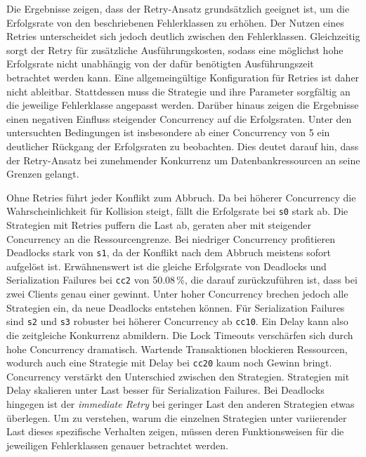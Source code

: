 
Die Ergebnisse zeigen, dass der Retry-Ansatz grundsätzlich geeignet ist, um die Erfolgsrate von den beschriebenen
Fehlerklassen zu erhöhen.
Der Nutzen eines Retries unterscheidet sich jedoch deutlich zwischen den Fehlerklassen.
Gleichzeitig sorgt der Retry für zusätzliche Ausführungskosten, sodass eine möglichst hohe Erfolgsrate nicht
unabhängig von der dafür benötigten Ausführungszeit betrachtet werden kann.
Eine allgemeingültige Konfiguration für Retries ist daher nicht ableitbar.
Stattdessen muss die Strategie und ihre Parameter sorgfältig an die jeweilige Fehlerklasse angepasst werden.
Darüber hinaus zeigen die Ergebnisse einen negativen Einfluss steigender Concurrency auf die Erfolgsraten.
Unter den untersuchten Bedingungen ist insbesondere ab einer Concurrency von 5 ein deutlicher Rückgang der
Erfolgsraten zu beobachten.
Dies deutet darauf hin, dass der Retry-Ansatz bei zunehmender Konkurrenz um Datenbankressourcen an seine Grenzen
gelangt.

Ohne Retries führt jeder Konflikt zum Abbruch.
Da bei höherer Concurrency die Wahrscheinlichkeit für Kollision steigt, fällt die Erfolgsrate bei \texttt{s0} stark ab.
Die Strategien mit Retries puffern die Last ab, geraten aber mit steigender Concurrency an die Ressourcengrenze.
Bei niedriger Concurrency profitieren Deadlocks stark von \texttt{s1}, da der Konflikt nach dem Abbruch meistens
sofort aufgelöst ist.
Erwähnenswert ist die gleiche Erfolgsrate von Deadlocks und Serialization Failures bei \texttt{cc2} von 50.08\,\%,
die darauf zurückzuführen ist, dass bei zwei Clients genau einer gewinnt.
Unter hoher Concurrency brechen jedoch alle Strategien ein, da neue Deadlocks entstehen können.
Für Serialization Failures sind \texttt{s2} und \texttt{s3} robuster bei höherer Concurrency ab \texttt{cc10}.
Ein Delay kann also die zeitgleiche Konkurrenz abmildern.
Die Lock Timeouts verschärfen sich durch hohe Concurrency dramatisch.
Wartende Transaktionen blockieren Ressourcen, wodurch auch eine Strategie mit Delay bei \texttt{cc20} kaum noch Gewinn
bringt.
Concurrency verstärkt den Unterschied zwischen den Strategien.
Strategien mit Delay skalieren unter Last besser für Serialization Failures.
Bei Deadlocks hingegen ist der \emph{immediate Retry} bei geringer Last den anderen Strategien etwas überlegen.
Um zu verstehen, warum die einzelnen Strategien unter variierender Last dieses spezifische Verhalten zeigen,
müssen deren Funktionsweisen für die jeweiligen Fehlerklassen genauer betrachtet werden.

